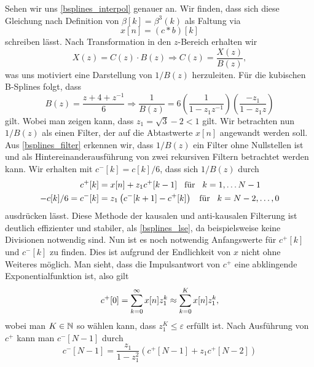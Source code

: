 Sehen wir uns \eqref{bsplines_interpol} genauer an. Wir finden, dass sich diese Gleichung nach Definition von $\beta[k] = \beta^3(k)$ als Faltung via
\begin{equation}\label{bsplines_conv}
    x[n] = (c \ast b)[k]
\end{equation}
schreiben l\"asst. Nach Transformation in den $z$-Bereich erhalten wir
\begin{equation}\label{bsplines_ztrafo}
    X(z) = C(z) \cdot B(z) \Rightarrow C(z) = \frac{X(z)}{B(z)},
\end{equation}
was uns motiviert eine Darstellung von $1/B(z)$ herzuleiten. F\"ur die kubischen B-Splines folgt, dass
\begin{equation}\label{bsplines_filter}
    B(z) = \frac{z + 4 + z^{-1}}{6} 
    \Rightarrow \frac{1}{B(z)} 
        = 6 \left(\frac{1}{1 - z_1 z^{-1}}\right) \left(\frac{-z_1}{1 - z_1 z}\right)
\end{equation}
gilt. Wobei man zeigen kann, dass $z_1 = \sqrt{3} - 2 < 1$ gilt. Wir betrachten nun $1/B(z)$ als einen Filter, der auf die Abtastwerte $x[n]$ angewandt werden soll. Aus \eqref{bsplines_filter} erkennen wir, dass $1/B(z)$ ein Filter ohne Nullstellen ist und als Hintereinanderausf\"uhrung von zwei rekursiven Filtern betrachtet werden kann. Wir erhalten mit $c^{-}[k] = c[k]/6$, dass sich $1/B(z)$ durch
\begin{align}
    c^+[k] &= 
        x[n] + z_1 c^+[k-1] {\hspace{3mm} \text{f\"ur} \hspace{3mm}} k = 1, \dots N-1 \\
    -c[k]/6 = c^-[k] &= 
        z_1\left( c^{-}[k+1] - c^+[k]\right) {\hspace{3mm} \text{f\"ur} \hspace{3mm}} k = N-2, \dots, 0
\end{align}
ausdr\"ucken l\"asst. Diese Methode der kausalen und anti-kausalen Filterung ist deutlich effizienter und stabiler, als \eqref{bsplines_lse}, da beispielsweise keine Divisionen notwendig sind. Nun ist es noch notwendig Anfangswerte f\"ur $c^+[k]$ und $c^-[k]$ zu finden. Dies ist aufgrund der Endlichkeit von $x$ nicht ohne Weiteres m\"oglich. Man sieht, dass die Impulsantwort von $c^+$ eine abklingende Exponentialfunktion ist, also gilt
\begin{equation}
    c^+[0] = {\sum\limits_{k=0}^{\infty}{x[n] z_1^k}} \approx {\sum\limits_{k=0}^{K}{x[n] z_1^k}},
\end{equation}
wobei man $K \in \mathbb{N}$ so w\"ahlen kann, dass $z_1^K \leqslant \varepsilon$ erf\"ullt ist. Nach Ausf\"uhrung von $c^+$ kann man $c^-[N-1]$ durch
\begin{equation}
    c^-[N-1] = \frac{z_1}{1 - z_1^2}\left(c^+[N-1] + z_1 c^+[N-2]\right)
\end{equation}
